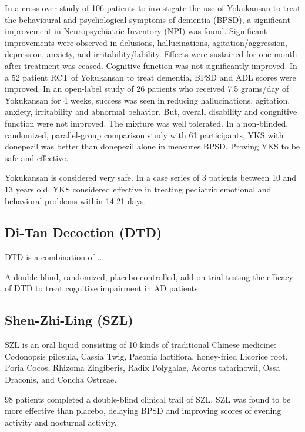 In a cross-over study of 106 patients to investigate the use of Yokukansan
to treat the behavioural and psychological symptoms of dementia (BPSD),
a significant improvement in
Neuropsychiatric Inventory (NPI) was found.
Significant improvements were observed in delusions,
hallucinations, agitation/aggression, depression, anxiety, and irritability/lability.
Effects were sustained for one month after treatment was ceased.
Cognitive function was not significantly improved.
\cite{mizukami2009randomized}
In a 52 patient RCT of Yokukansan to treat dementia,
BPSD and ADL scores were improved.
\cite{iwasaki2005randomized}
In an open-label study of 26 patients who received
7.5 grams/day of Yokukansan for 4 weeks,
success was seen in reducing
hallucinations, agitation, anxiety, irritability
and abnormal behavior.
But, overall disability and congnitive function were not improved.
The mixture was well tolerated.
\cite{hayashi2010treatment}
In a non-blinded, randomized, parallel-group comparison study
with 61 participants, YKS with donepezil was better than donepezil alone
in measures BPSD. Proving YKS to be safe and effective.
\cite{okahara2010effects}


Yokukansan is considered very safe.
In a case series of 3 patients between 10 and 13 years old,
YKS considered effective in treating pediatric emotional and behavioral problems
within 14-21 days.
\cite{tanaka2013potential}


\subsection{Di-Tan Decoction (DTD)}
DTD is a combination of ...

A double-blind, randomized, placebo-controlled, add-on trial
testing the efficacy of DTD to treat cognitive impairment
in AD patients.
\cite{chua2015efficacy}


\subsection{Shen-Zhi-Ling (SZL)}
SZL is an oral liquid consisting of 10 kinds of traditional Chinese medicine:
Codonopsis pilosula, Cassia Twig, Paeonia lactiflora,
honey-fried Licorice root, Poria Cocos, Rhizoma Zingiberis, Radix Polygalae,
Acorus tatarinowii, Ossa Draconis, and Concha Ostreae.

98 patients completed a double-blind clinical trail of SZL.
SZL was found to be more effective than placebo,
delaying BPSD and improving scores of evening activity
and nocturnal activity.
\cite{pan2014shen}





